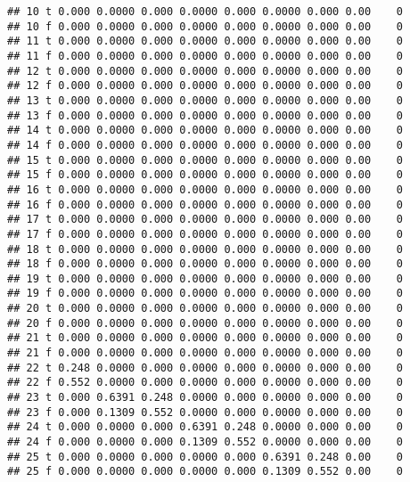 \documentclass[]{article}
\begin{document}
\begin{verbatim}
## 10 t 0.000 0.0000 0.000 0.0000 0.000 0.0000 0.000 0.00    0
## 10 f 0.000 0.0000 0.000 0.0000 0.000 0.0000 0.000 0.00    0
## 11 t 0.000 0.0000 0.000 0.0000 0.000 0.0000 0.000 0.00    0
## 11 f 0.000 0.0000 0.000 0.0000 0.000 0.0000 0.000 0.00    0
## 12 t 0.000 0.0000 0.000 0.0000 0.000 0.0000 0.000 0.00    0
## 12 f 0.000 0.0000 0.000 0.0000 0.000 0.0000 0.000 0.00    0
## 13 t 0.000 0.0000 0.000 0.0000 0.000 0.0000 0.000 0.00    0
## 13 f 0.000 0.0000 0.000 0.0000 0.000 0.0000 0.000 0.00    0
## 14 t 0.000 0.0000 0.000 0.0000 0.000 0.0000 0.000 0.00    0
## 14 f 0.000 0.0000 0.000 0.0000 0.000 0.0000 0.000 0.00    0
## 15 t 0.000 0.0000 0.000 0.0000 0.000 0.0000 0.000 0.00    0
## 15 f 0.000 0.0000 0.000 0.0000 0.000 0.0000 0.000 0.00    0
## 16 t 0.000 0.0000 0.000 0.0000 0.000 0.0000 0.000 0.00    0
## 16 f 0.000 0.0000 0.000 0.0000 0.000 0.0000 0.000 0.00    0
## 17 t 0.000 0.0000 0.000 0.0000 0.000 0.0000 0.000 0.00    0
## 17 f 0.000 0.0000 0.000 0.0000 0.000 0.0000 0.000 0.00    0
## 18 t 0.000 0.0000 0.000 0.0000 0.000 0.0000 0.000 0.00    0
## 18 f 0.000 0.0000 0.000 0.0000 0.000 0.0000 0.000 0.00    0
## 19 t 0.000 0.0000 0.000 0.0000 0.000 0.0000 0.000 0.00    0
## 19 f 0.000 0.0000 0.000 0.0000 0.000 0.0000 0.000 0.00    0
## 20 t 0.000 0.0000 0.000 0.0000 0.000 0.0000 0.000 0.00    0
## 20 f 0.000 0.0000 0.000 0.0000 0.000 0.0000 0.000 0.00    0
## 21 t 0.000 0.0000 0.000 0.0000 0.000 0.0000 0.000 0.00    0
## 21 f 0.000 0.0000 0.000 0.0000 0.000 0.0000 0.000 0.00    0
## 22 t 0.248 0.0000 0.000 0.0000 0.000 0.0000 0.000 0.00    0
## 22 f 0.552 0.0000 0.000 0.0000 0.000 0.0000 0.000 0.00    0
## 23 t 0.000 0.6391 0.248 0.0000 0.000 0.0000 0.000 0.00    0
## 23 f 0.000 0.1309 0.552 0.0000 0.000 0.0000 0.000 0.00    0
## 24 t 0.000 0.0000 0.000 0.6391 0.248 0.0000 0.000 0.00    0
## 24 f 0.000 0.0000 0.000 0.1309 0.552 0.0000 0.000 0.00    0
## 25 t 0.000 0.0000 0.000 0.0000 0.000 0.6391 0.248 0.00    0
## 25 f 0.000 0.0000 0.000 0.0000 0.000 0.1309 0.552 0.00    0
\end{verbatim}
\end{document}
